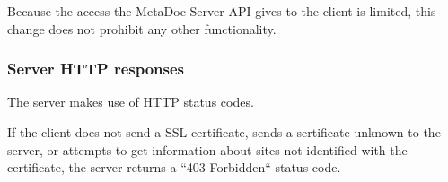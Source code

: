 Because the access the MetaDoc Server API gives to the client is limited, this 
change does not prohibit any other functionality. 

\subsubsection{Server HTTP responses}

The server makes use of HTTP status codes.

If the client does not send a SSL certificate, sends a sertificate unknown to 
the server, or attempts to get information about sites not identified with the
certificate, the server returns a ``403 Forbidden`` status code.
